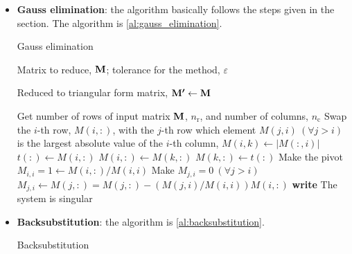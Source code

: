 \begin{itemize}
    \item \textbf{Gauss elimination}: the algorithm basically follows the steps
        given in the  section. The algorithm
        is \cref{al:gauss_elimination}.
        \begin{algorithm}
            \caption{Gauss elimination}\label{al:gauss_elimination}
            \begin{algorithmic}[1]

                \Input Matrix to reduce, $\boldsymbol{\mathrm{M}}$;
                tolerance for the method, $\varepsilon$ 

                \Output Reduced to triangular form matrix, $\boldsymbol{\mathrm{M'}} \leftarrow \boldsymbol{\mathrm{M}}$

                \State Get number of rows of input matrix $\boldsymbol{\mathrm{M}}$, $n_{\text{r}}$,
                and number of columns, $n_{\text{c}}$ 
                        \State Swap the $i$-th row, $M\left( i,: \right)$, with
                        the $j$-th row which element $M\left( j,i \right)\ \left( \forall j > i \right)$
                        is the largest absolute value of the $i$-th column,
                        $M\left( i,k \right) \leftarrow \left| M\left( :,i \right) \right|$
                            \State $t\left( : \right) \leftarrow M\left( i,: \right)$
                            \State $M\left( i,: \right) \leftarrow M\left( k,: \right)$
                            \State $M\left( k,: \right) \leftarrow t\left( : \right)$
                    \EndIf
                    \State Make the pivot $M_{i,i} = 1 \leftarrow M\left( i,: \right) / M\left( i,i \right)$
                        \Comment Make $M_{j,i} = 0\ \left( \forall j > i \right)$
                        \State $M_{j,i} \leftarrow M(j,:) = M(j,:) - \left( M(j,i)/M(i,i) \right) M(i,:)$
                    \EndFor
                \EndFor
                    \textbf{write} The system is singular
                \EndIf
                \EndProcedure
            \end{algorithmic}
        \end{algorithm}

    \item \textbf{Backsubstitution}: the algorithm is \cref{al:backsubstitution}.
        \begin{algorithm}
            \caption{Backsubstitution}\label{al:backsubstitution}
            \begin{algorithmic}[1]


\end{algorithmic}
\end{algorithm}
\end{itemize}
